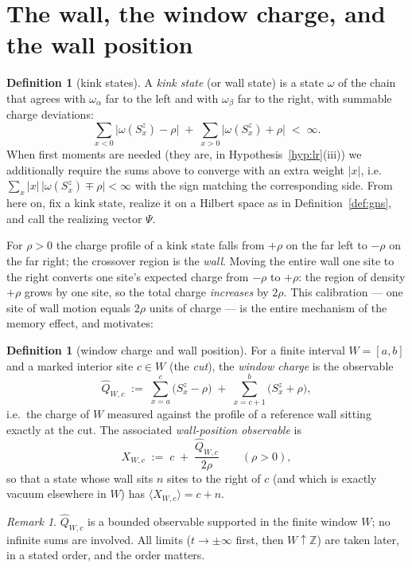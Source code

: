 \documentclass[11pt]{article}
\theoremstyle{definition}
\newtheorem{definition}[theorem]{Definition}
\theoremstyle{remark}
\newtheorem{remark}[theorem]{Remark}
\newcommand{\Z}{\mathbb{Z}}
\begin{document}
\section{The wall, the window charge, and the wall position}
\label{sec:wall}

\begin{definition}[kink states]\label{def:kink}
A \emph{kink state} (or wall state) is a state $\omega$ of the chain that
agrees with $\omega_\alpha$ far to the left and with $\omega_\beta$ far to the
right, with summable charge deviations:
\[
\sum_{x<0}\bigl|\omega(S^z_x)-\rho\bigr|
\;+\;\sum_{x>0}\bigl|\omega(S^z_x)+\rho\bigr| \;<\;\infty .
\]
When first moments are needed (they are, in Hypothesis~\ref{hyp:lr}(iii)) we
additionally require the sums above to converge with an extra weight $|x|$,
i.e.\ $\sum_x |x|\,\bigl|\omega(S^z_x)\mp\rho\bigr|<\infty$ with the sign
matching the corresponding side.  From here on, fix a kink
state, realize it on a Hilbert space as in Definition~\ref{def:gns}, and call
the realizing vector $\Psi$.
\end{definition}

For $\rho>0$ the charge profile of a kink state falls from $+\rho$ on the far
left to $-\rho$ on the far right; the crossover region is the \emph{wall}.
Moving the entire wall one site to the right converts one site's expected
charge from $-\rho$ to $+\rho$: the region of density $+\rho$ grows by one
site, so the total charge \emph{increases} by $2\rho$.  This calibration --- one site of wall motion equals $2\rho$ units of
charge --- is the entire mechanism of the memory effect, and motivates:

\begin{definition}[window charge and wall position]\label{def:window}
For a finite interval $W=[a,b]$ and a marked interior site $c\in W$ (the
\emph{cut}), the \emph{window charge} is the observable
\[
\widehat{Q}_{W,c}\;:=\;\sum_{x=a}^{c}\bigl(S^z_x-\rho\bigr)
\;+\;\sum_{x=c+1}^{b}\bigl(S^z_x+\rho\bigr),
\]
i.e.\ the charge of $W$ measured against the profile of a reference wall
sitting exactly at the cut.  The associated \emph{wall-position observable}
is
\[
X_{W,c}\;:=\;c\;+\;\frac{\widehat{Q}_{W,c}}{2\rho}\qquad(\rho>0),
\]
so that a state whose wall sits $n$ sites to the right of $c$ (and which is
exactly vacuum elsewhere in $W$) has $\langle X_{W,c}\rangle=c+n$.
\end{definition}

\begin{remark}
$\widehat{Q}_{W,c}$ is a bounded observable supported in the finite window
$W$; no infinite sums are involved.  All limits ($t\to\pm\infty$ first, then
$W\uparrow\Z$) are taken later, in a stated order, and the order matters.
\end{remark}
\end{document}
